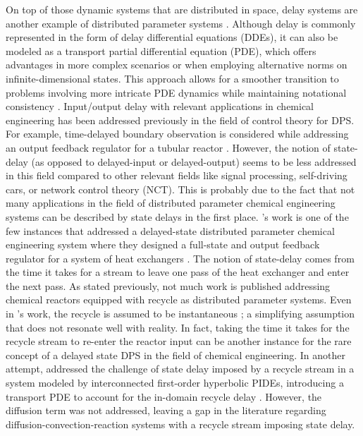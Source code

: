 On top of those dynamic systems that are distributed in space, delay systems are another example of distributed parameter systems \autocite{curtainbook}. Although delay is commonly represented in the form of delay differential equations (DDEs), it can also be modeled as a transport partial differential equation (PDE), which offers advantages in more complex scenarios or when employing alternative norms on infinite-dimensional states. This approach allows for a smoother transition to problems involving more intricate PDE dynamics while maintaining notational consistency \autocite{krstic2009book}. Input/output delay with relevant applications in chemical engineering has been addressed previously in the field of control theory for DPS. For example, time-delayed boundary observation is considered while addressing an output feedback regulator for a tubular reactor \autocite{Guilherme2019ACC}. However, the notion of state-delay (as opposed to delayed-input or delayed-output) seems to be less addressed in this field compared to other relevant fields like signal processing, self-driving cars, or network control theory (NCT). This is probably due to the fact that not many applications in the field of distributed parameter chemical engineering systems can be described by state delays in the first place. 's work is one of the few instances that addressed a delayed-state distributed parameter chemical engineering system where they designed a full-state and output feedback regulator for a system of heat exchangers \autocite{ozorio2019heat}. The notion of state-delay comes from the time it takes for a stream to leave one pass of the heat exchanger and enter the next pass. As stated previously, not much work is published addressing chemical reactors equipped with recycle as distributed parameter systems. Even in 's work, the recycle is assumed to be instantaneous \autocite{khatibi2021model}; a simplifying assumption that does not resonate well with reality. In fact, taking the time it takes for the recycle stream to re-enter the reactor input can be another instance for the rare concept of a delayed state DPS in the field of chemical engineering. In another attempt,  addressed the challenge of state delay imposed by a recycle stream in a system modeled by interconnected first-order hyperbolic PIDEs, introducing a transport PDE to account for the in-domain recycle delay \autocite{qi2021output}. However, the diffusion term was not addressed, leaving a gap in the literature regarding diffusion-convection-reaction systems with a recycle stream imposing state delay.

